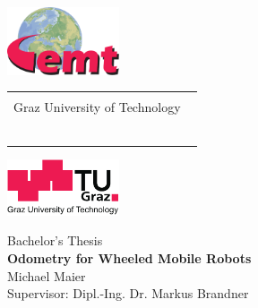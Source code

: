
\begin{titlepage}

  \begin{center}
    \begin{minipage}[htb]{18cm}
      \hspace*{-2.6cm}
      \includegraphics[width=3.3cm]{./figures/logos/LogoEMT.pdf}
      \begin{tabular}{p{10cm}}\centering{
      \Large Institute of Electrical Measurement and Measurement Signal Processing\\ Graz University of Technology
      ~\\
      ~\\}
      \end{tabular}
      \includegraphics[width=3.3cm]{./figures/logos/TUG.pdf}
    \end{minipage}

    \Large {Bachelor's Thesis\\} %
    \vspace*{1cm} \huge{\textbf{Odometry for Wheeled Mobile Robots}\\}
    \vspace*{1.0cm} 
    \Large{Michael Maier\\} \vspace*{1cm}
    \Large{Supervisor: Dipl.-Ing. Dr. Markus Brandner\\} \vspace*{2.5cm}%



\end{center}
\end{titlepage}
